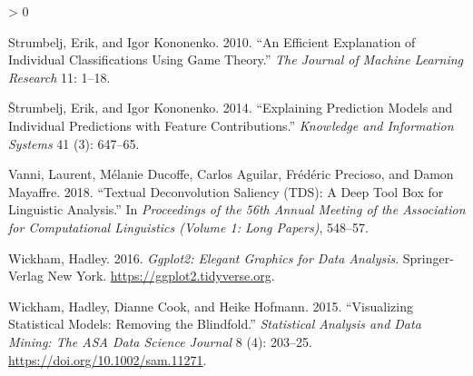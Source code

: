 \documentclass[
]{article}
\newlength{\cslhangindent}
\newenvironment{CSLReferences}[2] %
 {%
  \setlength{\parindent}{0pt}
  \ifodd #1 \everypar{\setlength{\hangindent}{\cslhangindent}}\ignorespaces\fi
  \ifnum #2 > 0
  \setlength{\parskip}{#2\baselineskip}
  \fi
 }%
 {}
\begin{document}
\begin{CSLReferences}{1}{0}
\leavevmode\hypertarget{ref-strumbelj_efficient_2010}{}%
Strumbelj, Erik, and Igor Kononenko. 2010. {``An Efficient Explanation of Individual Classifications Using Game Theory.''} \emph{The Journal of Machine Learning Research} 11: 1--18.

\leavevmode\hypertarget{ref-strumbelj_explaining_2014}{}%
Štrumbelj, Erik, and Igor Kononenko. 2014. {``Explaining Prediction Models and Individual Predictions with Feature Contributions.''} \emph{Knowledge and Information Systems} 41 (3): 647--65.

\leavevmode\hypertarget{ref-vanni_textual_2018}{}%
Vanni, Laurent, Mélanie Ducoffe, Carlos Aguilar, Frédéric Precioso, and Damon Mayaffre. 2018. {``Textual {Deconvolution} {Saliency} ({TDS}): A Deep Tool Box for Linguistic Analysis.''} In \emph{Proceedings of the 56th {Annual} {Meeting} of the {Association} for {Computational} {Linguistics} ({Volume} 1: {Long} {Papers})}, 548--57.

\leavevmode\hypertarget{ref-wickham_ggplot2_2016}{}%
Wickham, Hadley. 2016. \emph{Ggplot2: {Elegant} {Graphics} for {Data} {Analysis}}. Springer-Verlag New York. \url{https://ggplot2.tidyverse.org}.

\leavevmode\hypertarget{ref-wickham_visualizing_2015}{}%
Wickham, Hadley, Dianne Cook, and Heike Hofmann. 2015. {``Visualizing Statistical Models: {Removing} the Blindfold.''} \emph{Statistical Analysis and Data Mining: The ASA Data Science Journal} 8 (4): 203--25. \url{https://doi.org/10.1002/sam.11271}.

\end{CSLReferences}
\end{document}

